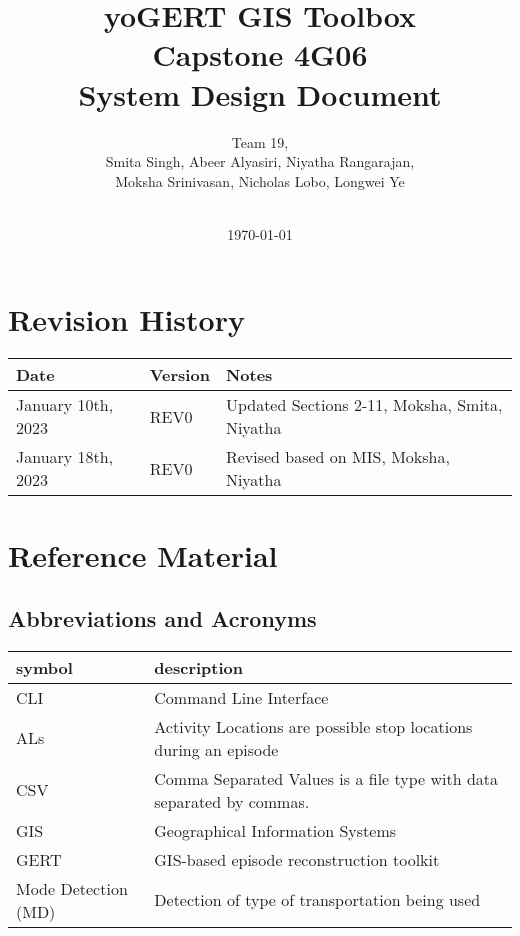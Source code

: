 \documentclass[12pt, titlepage]{article}
\begin{document}
\title{\textbf{yoGERT GIS Toolbox}\\ Capstone 4G06\\ System Design Document}
\author{Team 19,
		\\ Smita Singh, Abeer Alyasiri, Niyatha Rangarajan,\\ Moksha Srinivasan, Nicholas Lobo, Longwei Ye \\\\
}
\date{\today}

\maketitle


\section{Revision History}

\begin{tabularx}{\textwidth}{p{3cm}p{2cm}X}
\toprule {\bf Date} & {\bf Version} & {\bf Notes}\\
\midrule
January 10th, 2023 & REV0 & Updated Sections 2-11, Moksha, Smita, Niyatha\\
January 18th, 2023 & REV0 & Revised based on MIS, Moksha, Niyatha \\
\bottomrule
\end{tabularx}

\newpage

\section{Reference Material}

\subsection{Abbreviations and Acronyms}

\renewcommand{\arraystretch}{1.2}
\begin{tabular}{l l} 
  \toprule		
  \textbf{symbol} & \textbf{description}\\
  \midrule 
   CLI & Command Line Interface\\
   ALs & Activity Locations are possible stop locations during an episode \\
   CSV & Comma Separated Values is a file type with data separated by commas. \\
   GIS & Geographical Information Systems\\
   GERT & GIS-based episode reconstruction toolkit \\
   Mode Detection (MD) & Detection of type of transportation being used \\
  \bottomrule
\end{tabular}\\
\end{document}
